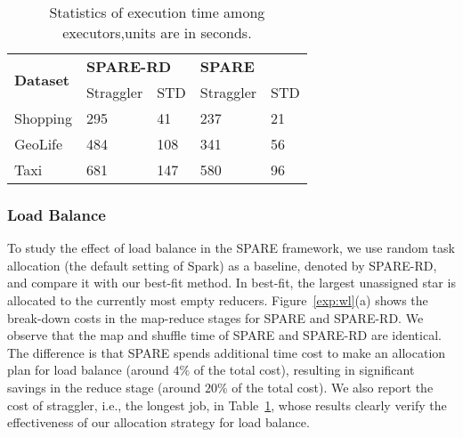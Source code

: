 \begin{table}[h]
\centering
\begin{tabular}{|l|l|l|l|l|}
\hline
\multirow{2}{*}{\textbf{Dataset}} & \multicolumn{2}{l|}{\textbf{SPARE-RD}} & \multicolumn{2}{l|}{\textbf{SPARE}} \\ \cline{2-5} 
                         & Straggler        & STD        & Straggler       & STD      \\ \hline
Shopping                 & 295              & 41         & 237             & 21       \\ \hline
GeoLife                  & 484              & 108        & 341             & 56       \\ \hline
Taxi                     & 681              & 147        & 580             & 96       \\ \hline
\end{tabular}
  \caption{Statistics of execution time among executors,units are in seconds.}
  \label{tbl:strags}
\end{table}

\subsubsection{Load Balance}
To study the effect of load balance in the SPARE framework, we use random task allocation (the default setting of Spark) as a baseline, denoted by SPARE-RD, and compare it with our best-fit method. In best-fit, the largest unassigned star is allocated to the currently most empty reducers.
Figure~\ref{exp:wl}(a) shows the break-down costs in the map-reduce stages for SPARE and SPARE-RD. We observe that the map and shuffle time of SPARE and SPARE-RD are identical. The difference is that SPARE spends additional time cost to make an allocation plan for load balance (around $4\%$ of the total cost), resulting in significant savings in the reduce stage (around $20\%$ of the total cost). We also report the cost of straggler, i.e., the longest job, in Table~\ref{tbl:strags}, whose results clearly verify the effectiveness of our allocation strategy for load balance.

